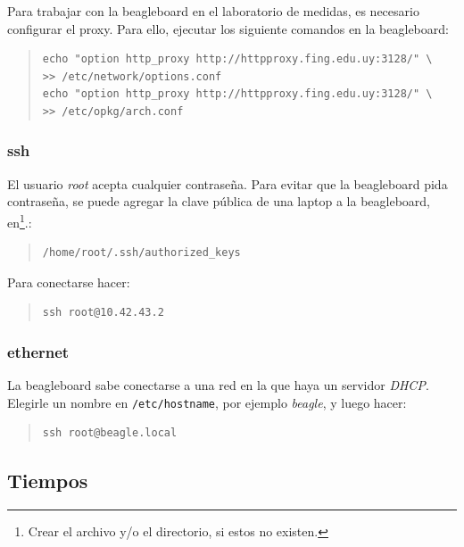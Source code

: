 \documentclass[main]{subfiles}
\begin{document}
Para trabajar con la beagleboard en el laboratorio de medidas, es necesario configurar el proxy. Para ello, ejecutar los siguiente comandos en la beagleboard:
\begin{quote}
\begin{verbatim}
echo "option http_proxy http://httpproxy.fing.edu.uy:3128/" \
>> /etc/network/options.conf
echo "option http_proxy http://httpproxy.fing.edu.uy:3128/" \
>> /etc/opkg/arch.conf
\end{verbatim}
\end{quote}

\subsubsection{ssh}
\label{sec:codigo:ssh}

El usuario \textit{root} acepta cualquier contraseña. Para evitar que la beagleboard pida contraseña, se puede agregar la clave pública de una laptop a la beagleboard, en\footnote{Crear el archivo y/o el directorio, si estos no existen.}.:
\begin{quote}
\begin{verbatim}
/home/root/.ssh/authorized_keys
\end{verbatim}
\end{quote}

Para conectarse hacer:
\begin{quote}
\begin{verbatim}
ssh root@10.42.43.2
\end{verbatim}
\end{quote}


\subsubsection{ethernet}
\label{sec:codigo:ethernet}

La beagleboard sabe conectarse a una red en la que haya un servidor \textit{DHCP}. Elegirle un nombre en \verb+/etc/hostname+, por ejemplo \textit{beagle}, y luego hacer:
\begin{quote}
\begin{verbatim}
ssh root@beagle.local
\end{verbatim}
\end{quote}

\subsection{Tiempos}
\label{sec:codigo:tiempos}
\end{document}
